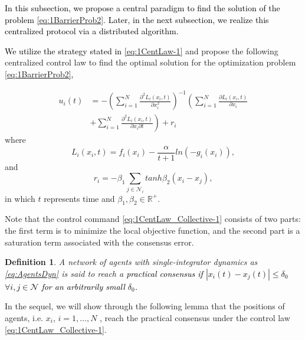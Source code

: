 \documentclass[letterpaper, 10 pt, conference]{ieeeconf}  %
\newtheorem{definition}[theorem]{Definition}
\newcommand{\crr}{\color{black}}
\begin{document}
{\textcolor{black}{In this subsection, we propose a central paradigm
	to find the solution of the problem }{\eqref{eq:1BarrierProb2}.
}\textcolor{black}{Later, in the next subsection, we realize this
	centralized protocol via a distributed algorithm. }

\textcolor{black}{We utilize the strategy stated in } \eqref{eq:1CentLaw-1} and propose the
following centralized control law to find {\crr the optimal solution for  the optimization problem}
\textcolor{black}{\eqref{eq:1BarrierProb2}}\textcolor{black}{,}

\begin{equation}
\begin{split}
u_{i}(t)&=-\left(\sum_{i=1}^{N}\frac{\partial^{2}L_{i}(x_i,t)}{\partial x_{i}^{2}}\right)^{-1}\left(\sum_{i=1}^{N}\frac{\partial L_{i}(x_i,t)}{\partial x_{i}}\right.\\&\left.+\sum_{i=1}^{N}\frac{\partial^{2}L_{i}(x_i,t)}{\partial x_{i}\partial t}\right)+r_{i}\label{eq:1CentLaw_Collective-1}
\end{split}
\end{equation}
where
\begin{equation}
L_{i}(x_{i},t)=f_{i}(x_{i})-\frac{\alpha}{t+1}ln\left(-g_{i}(x_{i})\right),\label{eq:L}
\end{equation}
and
\begin{equation}
r_{i}=-\beta_{1}\sum_{j\in\mathcal{{N}}_{i}}tanh\beta_{2}(x_{i}-x_{j}),
\end{equation}
in which $t$ represents time and $\beta_{1},\beta_{2}\in\mathbb{R}^{+}$.

Note that the control command \eqref{eq:1CentLaw_Collective-1} consists
of two parts: the first term is to minimize the local objective function,
and the second part is a saturation term associated with the consensus
error.

\begin{definition}
	A network of agents with single-integrator dynamics as \eqref{eq:AgentsDyn}
	is said to reach a \textit{\textcolor{black}{practical consensus
			if $\left|x_{i}(t)-x_{j}(t)\right|\leq\delta_{0}$ }}\textcolor{black}{$\forall i,j\in\mathcal{{N}}$
		for an arbitrarily small $\delta_{0}$.}\end{definition}
	
In the sequel, we will show through the following lemma that the positions
of agents, i.e. $x_{i}$, $i=1,\ldots,N$ , reach the practical  consensus
under the control law \eqref{eq:1CentLaw_Collective-1}.

}
\end{document}
